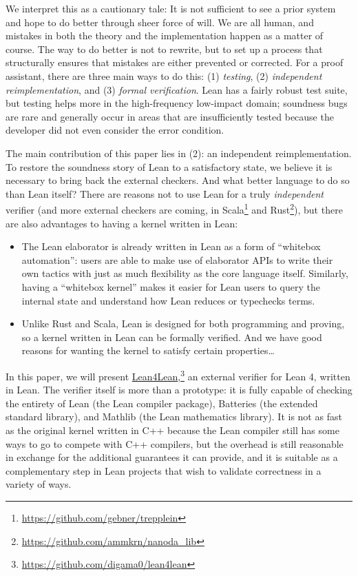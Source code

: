 \documentclass[sigplan,10pt,screen]{acmart}\settopmatter{printfolios=true,printccs=false,printacmref=false}
\newcommand{\lfl}{\textsf{Lean4Lean}\xspace}
\begin{document}
We interpret this as a cautionary tale: It is not sufficient to see a prior system and hope to do better through sheer force of will. We are all human, and mistakes in both the theory and the implementation happen as a matter of course. The way to do better is not to rewrite, but to set up a process that structurally ensures that mistakes are either prevented or corrected. For a proof assistant, there are three main ways to do this: (1) \emph{testing}, (2) \emph{independent reimplementation}, and (3) \emph{formal verification}. Lean has a fairly robust test suite, but testing helps more in the high-frequency low-impact domain; soundness bugs are rare and generally occur in areas that are insufficiently tested because the developer did not even consider the error condition.

The main contribution of this paper lies in (2): an independent reimplementation. To restore the soundness story of Lean to a satisfactory state, we believe it is necessary to bring back the external checkers. And what better language to do so than Lean itself?  There are reasons not to use Lean for a truly \emph{independent} verifier (and more external checkers are coming, in Scala\footnote{\url{https://github.com/gebner/trepplein}} and Rust\footnote{\url{https://github.com/ammkrn/nanoda_lib}}), but there are also advantages to having a kernel written in Lean:
\begin{itemize}
  \item The Lean elaborator is already written in Lean as a form of ``whitebox automation'': users are able to make use of elaborator APIs to write their own tactics with just as much flexibility as the core language itself. Similarly, having a ``whitebox kernel'' makes it easier for Lean users to query the internal state and understand how Lean reduces or typechecks terms.
  \item Unlike Rust and Scala, Lean is designed for both programming and proving, so a kernel written in Lean can be formally verified. And we have good reasons for wanting the kernel to satisfy certain properties\ldots
\end{itemize}

In this paper, we will present \href{https://github.com/digama0/lean4lean}{\lfl},\footnote{\url{https://github.com/digama0/lean4lean}} an external verifier for Lean 4, written in Lean. The verifier itself is more than a prototype: it is fully capable of checking the entirety of \textsf{Lean} (the Lean compiler package), \textsf{Batteries} (the extended standard library), and \textsf{Mathlib} (the Lean mathematics library). It is not as fast as the original kernel written in C++ because the Lean compiler still has some ways to go to compete with C++ compilers, but the overhead is still reasonable in exchange for the additional guarantees it can provide, and it is suitable as a complementary step in Lean projects that wish to validate correctness in a variety of ways.
\end{document}
